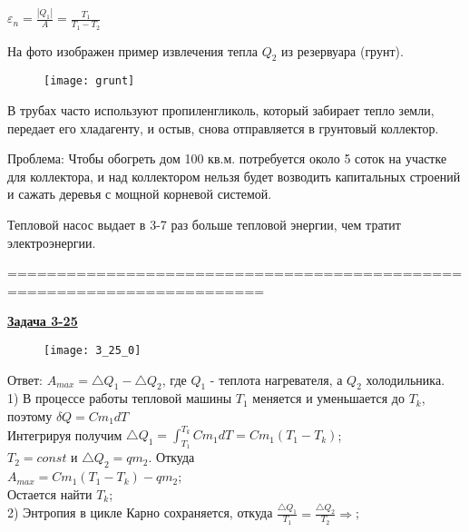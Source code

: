 \documentclass[12pt]{article}
\begin{document}
{{$\varepsilon_n=\frac{|Q_1|}{A}=\frac{T_1}{T_1-T_2}$

На фото изображен пример извлечения тепла $Q_2$ из  резервуара (грунт).

\begin{figure}[h]
\begin{center}
\texttt{[image: grunt]}
\end{center}
\end{figure}

В трубах часто используют пропиленгликоль, который забирает тепло земли, передает его хладагенту, и остыв, снова отправляется в грунтовый коллектор.

Проблема: Чтобы обогреть дом 100 кв.м. потребуется около 5 соток на участке для коллектора, и над коллектором нельзя будет возводить капитальных строений и сажать деревья с мощной корневой системой.

Тепловой насос  выдает в 3-7 раз больше тепловой энергии, чем тратит электроэнергии.




========================================================================

\newpage

{\underline\bf Задача 3-25}

\vspace{0.5cm}

\begin{figure}[h]
\texttt{[image: 3\_25\_0]}
\end{figure}

\vspace{0.5cm}

Ответ: $A_{max}=\triangle Q_1-\triangle Q_2$, где $Q_1$ - теплота нагревателя, а $Q_2$ холодильника.\\

1) В процессе работы тепловой машины $T_1$ меняется и уменьшается до $T_k$, поэтому $\delta Q=Cm_1dT$\\

Интегрируя получим $\triangle Q_1=\int_{T_1}^{T_k}Cm_1dT=Cm_1(T_1-T_k)$;\\

$T_2=const$ и $\triangle Q_2=qm_2$. Откуда\\

$A_{max}=Cm_1(T_1-T_k)-qm_2$;\\ Остается найти $T_k$;\\

2) Энтропия в цикле Карно сохраняется, откуда $\frac{\triangle Q_1}{T_1}=\frac{\triangle Q_2}{T_2}\Rightarrow$;\\

}}
\end{document}

